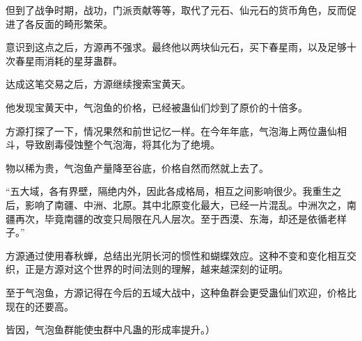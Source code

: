 \begin{this_body}
但到了战争时期，战功，门派贡献等等，取代了元石、仙元石的货币角色，反而促进了各反面的畸形繁荣。

意识到这点之后，方源再不强求。最终他以两块仙元石，买下春星雨，以及足够十次春星雨消耗的星芽蛊群。

达成这笔交易之后，方源继续搜索宝黄天。

他发现宝黄天中，气泡鱼的价格，已经被蛊仙们炒到了原价的十倍多。

方源打探了一下，情况果然和前世记忆一样。在今年年底，气泡海上两位蛊仙相斗，导致剧毒侵蚀整个气泡海，将其化为了绝境。

物以稀为贵，气泡鱼产量降至谷底，价格自然而然就上去了。

“五大域，各有界壁，隔绝内外，因此各成格局，相互之间影响很少。我重生之后，影响了南疆、中洲、北原。其中北原变化最大，已经一片混乱。中洲次之，南疆再次，毕竟南疆的改变只局限在凡人层次。至于西漠、东海，却还是依循老样子。”

方源通过使用春秋蝉，总结出光阴长河的惯性和蝴蝶效应。这种不变和变化相互交织，正是方源对这个世界的时间法则的理解，越来越深刻的证明。

至于气泡鱼，方源记得在今后的五域大战中，这种鱼群会更受蛊仙们欢迎，价格比现在的还要高。

皆因，气泡鱼群能使虫群中凡蛊的形成率提升。）

\end{this_body}

